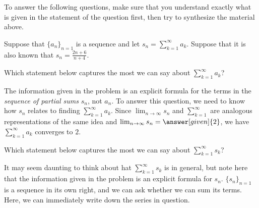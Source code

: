 \documentclass{ximera}
\begin{document}
To answer the following questions, make sure that you understand exactly what is given in the statement of the question first, then try to synthesize the material above.

\begin{example}
Suppose that $\{a_n\}_{n=1}$ is a sequence and let $s_n = \sum_{k=1}^{\infty} a_k$.  Suppose that it is also known that $s_n = \frac{2n+6}{n+4}$.

\begin{question}
Which statement below captures the most we can say about $\sum_{k=1}^{\infty} a_k$? 

\begin{multipleChoice}
\end{multipleChoice}

\begin{feedback}
The information given in the problem is an explicit formula for the terms in the \emph{sequence of partial sums} $s_n$, not $a_n$.  To answer this question, we need to know how $s_n$ relates to finding $\sum_{k=1}^{\infty} a_k$.  Since $\lim_{n \to \infty} s_n$ and $\sum_{k=1}^{\infty}$ are analogous representations of the same idea and $\lim_{n \to \infty} s_n = \answer[given]{2}$, we have $\sum_{k=1}^{\infty} a_k$ converges to $2$. 
\end{feedback}
\end{question}
\begin{question}
Which statement below captures the most we can say about $\sum_{k=1}^{\infty} s_k$? 

\begin{multipleChoice}
\end{multipleChoice}

\begin{feedback}
It may seem daunting to think about hat $\sum_{k=1}^{\infty} s_k$ is in general, but note here that the information given in the problem is an explicit formula for $s_n$.  $\{s_n\}_{n=1}$ is a sequence in its own right, and we can ask whether we can sum its terms.  Here, we can immediately write down the series in question.


\end{feedback}
\end{question}
\end{example}
\end{document}
